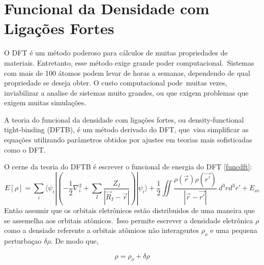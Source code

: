 \section{Funcional da Densidade com Ligações Fortes}

O DFT é um método poderoso para cálculos de muitas propriedades de materiais. Entretanto, esse método exige grande poder computacional.\
Sistemas com mais de 100 átomos podem levar de horas a semanas, dependendo de qual propriedade se deseja obter. O custo computacional pode\
muitas vezes, inviabilizar a analise de sistemas muito grandes, ou que exigem problemas que exigem muitas simulações.

A teoria do funcional da densidade com ligações fortes, ou density-functional tight-binding (DFTB), é um método derivado do DFT, que\
visa simplificar as equações utilizando parâmetros obtidos por ajustes em teorias mais sofisticadas como o DFT.

O cerne da teoria do DFTB é escrever o funcional de energia do DFT \ref{funcdft}:
\begin{equation}
    E[\rho] = \sum_i \langle\psi_i| \left( -\frac{1}{2} \nabla_i^2 + \sum_I\frac{Z_I}{|\vec{R}_I-\vec{r}|} \right) |\psi_i\rangle + \frac{1}{2}\iint \frac{\rho(\vec{r})\rho(\vec{r'})}{|\vec{r}-\vec{r'}|} ~d^3rd^3r'+E_{xc}
\end{equation}
Então assumir que os orbitais eletrônicos estão distribuidos de uma maneira que se assemelha aos orbitais atômicos.\
Isso permite escrever a densidade eletrônica $\rho$ como a densiade referente a orbitais atômicos não interagentes $\rho_o$ e uma pequena perturbaçao $\delta\rho$. De modo que,

\begin{equation}
    \rho = \rho_o + \delta\rho
\end{equation}

